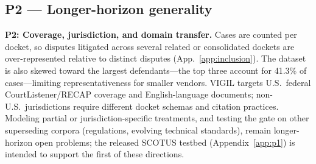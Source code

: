 \subsection*{P2 --- Longer-horizon generality}

\textbf{P2: Coverage, jurisdiction, and domain transfer.}
Cases are counted per docket, so disputes litigated across several related or consolidated dockets are over-represented relative to distinct disputes (App.~\ref{app:inclusion}). The dataset is also skewed toward the largest defendants---the top three account for 41.3\% of cases---limiting representativeness for smaller vendors. VIGIL targets U.S.\ federal CourtListener/RECAP coverage and English-language documents; non-U.S.\ jurisdictions require different docket schemas and citation practices. Modeling partial or jurisdiction-specific treatments, and testing the gate on other superseding corpora (regulations, evolving technical standards), remain longer-horizon open problems; the released SCOTUS testbed (Appendix~\ref{app:p1}) is intended to support the first of these directions.
